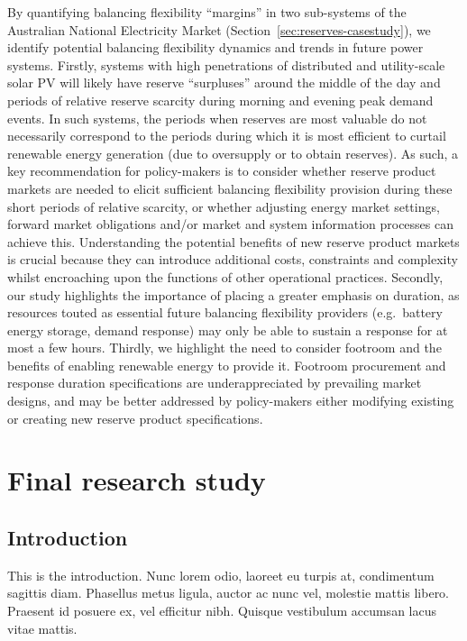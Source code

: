 \documentclass[12pt,a4paper,]{report}
\begin{document}
By quantifying balancing flexibility ``margins'' in two sub-systems of
the Australian National Electricity Market
(Section~\ref{sec:reserves-casestudy}), we identify potential balancing
flexibility dynamics and trends in future power systems. Firstly,
systems with high penetrations of distributed and utility-scale solar PV
will likely have reserve ``surpluses'' around the middle of the day and
periods of relative reserve scarcity during morning and evening peak
demand events. In such systems, the periods when reserves are most
valuable do not necessarily correspond to the periods during which it is
most efficient to curtail renewable energy generation (due to oversupply
or to obtain reserves). As such, a key recommendation for policy-makers
is to consider whether reserve product markets are needed to elicit
sufficient balancing flexibility provision during these short periods of
relative scarcity, or whether adjusting energy market settings, forward
market obligations and/or market and system information processes can
achieve this. Understanding the potential benefits of new reserve
product markets is crucial because they can introduce additional costs,
constraints and complexity whilst encroaching upon the functions of
other operational practices. Secondly, our study highlights the
importance of placing a greater emphasis on duration, as resources
touted as essential future balancing flexibility providers (e.g.~battery
energy storage, demand response) may only be able to sustain a response
for at most a few hours. Thirdly, we highlight the need to consider
footroom and the benefits of enabling renewable energy to provide it.
Footroom procurement and response duration specifications are
underappreciated by prevailing market designs, and may be better
addressed by policy-makers either modifying existing or creating new
reserve product specifications.

\hypertarget{sec:fourth}{%
\chapter{Final research study}\label{sec:fourth}}

\hypertarget{introduction-2}{%
\section{Introduction}\label{introduction-2}}

This is the introduction. Nunc lorem odio, laoreet eu turpis at,
condimentum sagittis diam. Phasellus metus ligula, auctor ac nunc vel,
molestie mattis libero. Praesent id posuere ex, vel efficitur nibh.
Quisque vestibulum accumsan lacus vitae mattis.
\end{document}
